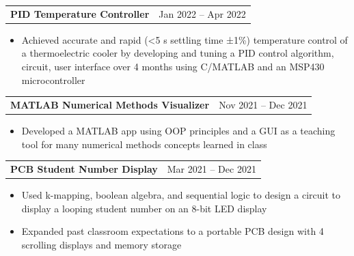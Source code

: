 \documentclass[a4paper,10pt]{article}
\begin{document}
\begin{tabularx}{\linewidth}{@{}X r@{}}
\begin{minipage}[t]{\linewidth}
  \textbf{PID Temperature Controller}
\end{minipage}
&     Jan 2022 -- Apr 2022
\end{tabularx}


\begin{itemize}[nosep,after=\strut, leftmargin=1em, itemsep=3pt,label=--]
  \item Achieved accurate and rapid (<5 s settling time ±1\%) temperature control of a thermoelectric cooler by developing and tuning a PID control algorithm, circuit, user interface over 4 months using C/MATLAB and an MSP430 microcontroller
\end{itemize}


\begin{tabularx}{\linewidth}{@{}X r@{}}
\begin{minipage}[t]{\linewidth}
  \textbf{MATLAB Numerical Methods Visualizer}
\end{minipage}
&     Nov 2021 -- Dec 2021
\end{tabularx}


\begin{itemize}[nosep,after=\strut, leftmargin=1em, itemsep=3pt,label=--]
  \item Developed a MATLAB app using OOP principles and a GUI as a teaching tool for many numerical methods concepts learned in class
\end{itemize}


\begin{tabularx}{\linewidth}{@{}X r@{}}
\begin{minipage}[t]{\linewidth}
  \textbf{PCB Student Number Display}
\end{minipage}
&     Mar 2021 -- Dec 2021
\end{tabularx}


\begin{itemize}[nosep,after=\strut, leftmargin=1em, itemsep=3pt,label=--]
  \item Used k-mapping, boolean algebra, and sequential logic to design a circuit to display a looping student number on an 8-bit LED display
\item Expanded past classroom expectations to a portable PCB design with 4 scrolling displays and memory storage
\end{itemize}
\end{document}
